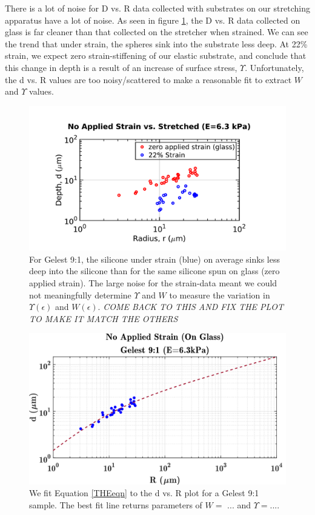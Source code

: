 There is a lot of noise for D vs. R data collected with substrates on our stretching apparatus have a lot of noise. As seen in figure \ref{fig:glassvsstretched190218}, the D vs. R data collected on glass is far cleaner than that collected on the stretcher when strained. We can see the trend that under strain, the spheres sink into the substrate less deep. At 22\% strain, we expect zero strain-stiffening of our elastic substrate, and conclude that this change in depth is a result of an increase of surface stress, $ \Upsilon $. Unfortunately, the d vs. R values are too noisy/scattered to make a reasonable fit to extract $ W $ and $ \Upsilon $ values.

\begin{figure}[h!]
	\centering
	\includegraphics[width=\linewidth]{Chapters/Figures/glass_vs_stretched_190218}
	\caption[Glass vs. Stretched d vs. R]{For Gelest 9:1, the silicone under strain (blue) on average sinks less deep into the silicone than for the same silicone spun on glass (zero applied strain). The large noise for the strain-data meant we could not meaningfully determine $ \Upsilon $ and $ W $ to measure the variation in $ \Upsilon(\epsilon)$ and $W(\epsilon)$. \emph{COME BACK TO THIS AND FIX THE PLOT TO MAKE IT MATCH THE OTHERS}}
	\label{fig:glassvsstretched190218}
\end{figure}

\begin{figure}[h!]
	\centering
	\includegraphics[width=\linewidth]{Chapters/Figures/w_ups_fit_G9-1}
	\caption[Gelest W-$\Upsilon$ Fit]{We fit Equation \ref{THEeqn} to the d vs. R plot for a Gelest 9:1 sample. The best fit line returns parameters of $ W= $ ... and $ \Upsilon= $.... }
	\label{fig:wupsfitg9-1}
\end{figure}

